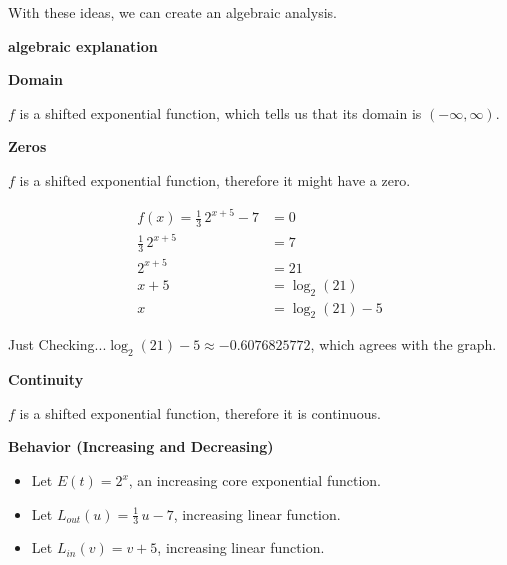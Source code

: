 \documentclass{ximera}
\begin{document}
\begin{example}
\begin{image}
\end{image}


With these ideas, we can create an algebraic analysis.

\textbf{\textcolor{red!75!green}{algebraic explanation}} 




\textbf{Domain}

$f$ is a shifted exponential function, which tells us that its domain is $(-\infty, \infty)$. 


\textbf{Zeros}

$f$ is a shifted exponential function, therefore it might have a zero. 




\begin{align*}
f(x) = \frac{1}{3} \, 2^{x+5} - 7 & = 0 \\
\frac{1}{3} \, 2^{x+5}            & = 7  \\
2^{x+5}                           & = 21  \\
x+5                               & = \log_2(21)  \\
x                                 & = \log_2(21) - 5
\end{align*}



Just Checking...$\log_2(21) - 5 \approx -0.6076825772$, which agrees with the graph. 





\textbf{Continuity}

$f$ is a shifted exponential function, therefore it is continuous. 




\textbf{Behavior (Increasing and Decreasing)}


\begin{itemize}
\item Let $E(t) = 2^x$, an increasing core exponential function.
\item Let $L_{out}(u) = \frac{1}{3} \, u - 7$, increasing linear function.
\item Let $L_{in}(v) = v+5$, increasing linear function.
\end{itemize}





\end{example}
\end{document}

